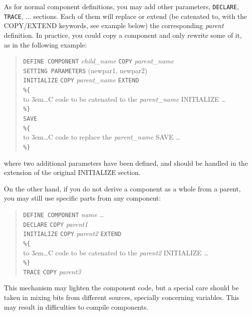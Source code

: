As for normal component definitions, you may add other parameters, \texttt{DECLARE}, \texttt{TRACE}, ... sections. Each of them will replace or extend (be catenated to, with the COPY/EXTEND keywords, see example below) the corresponding {\it parent} definition. In practice, you could copy a component and only rewrite some of it, as in the following example:
\begin{quote}
  \texttt{DEFINE COMPONENT} {\it child\_name} \texttt{COPY} {\it parent\_name} \\

  \texttt{SETTING PARAMETERS} (newpar1, newpar2) \\
  \texttt{INITIALIZE} \texttt{COPY} {\it parent\_name} \texttt{EXTEND} \\
  \verb|%{|  \\
  \hbox to 3em{}\ldots C code to be catenated to the {\it parent\_name} INITIALIZE \ldots  \\
  \verb|%}| \\
  \texttt{SAVE} \\
  \verb|%{|  \\
  \hbox to 3em{}\ldots C code to replace the {\it parent\_name} SAVE \ldots  \\
  \verb|%}| \\
\end{quote}
where two additional parameters have been defined, and should be handled in the extension of the original INITIALIZE section.

On the other hand, if you do not derive a component as a whole from a parent, you may still use specific parts from any component:
\begin{quote}
  \texttt{DEFINE COMPONENT} {\it name} \ldots \\
  \texttt{DECLARE} \texttt{COPY} {\it parent1} \\
  \texttt{INITIALIZE} \texttt{COPY} {\it parent2} \texttt{EXTEND} \\
  \verb|%{|  \\
  \hbox to 3em{}\ldots C code to be catenated to the {\it parent2} INITIALIZE \ldots  \\
  \verb|%}| \\
  \texttt{TRACE} \texttt{COPY} {\it parent3}
\end{quote}

This mechanism may lighten the component code, but a special care should be taken in mixing bits from different sources, specially concerning variables. This may result in difficulties to compile components.

